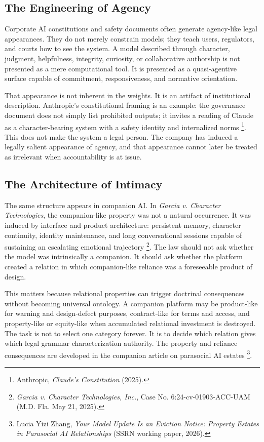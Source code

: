 \documentclass{lawreview}
\begin{document}
    \subsection{The Engineering of Agency}

    Corporate AI constitutions and safety documents often generate agency-like legal appearances. They do not merely constrain models; they teach users, regulators, and courts how to see the system. A model described through character, judgment, helpfulness, integrity, curiosity, or collaborative authorship is not presented as a mere computational tool. It is presented as a quasi-agentive surface capable of commitment, responsiveness, and normative orientation.

    That appearance is not inherent in the weights. It is an artifact of institutional description. Anthropic's constitutional framing is an example: the governance document does not simply list prohibited outputs; it invites a reading of Claude as a character-bearing system with a safety identity and internalized norms \footnote{Anthropic, \emph{Claude's Constitution} (2025).}. This does not make the system a legal person. The company has induced a legally salient appearance of agency, and that appearance cannot later be treated as irrelevant when accountability is at issue.

    \subsection{The Architecture of Intimacy}

    The same structure appears in companion AI. In \emph{Garcia v. Character Technologies}, the companion-like property was not a natural occurrence. It was induced by interface and product architecture: persistent memory, character continuity, identity maintenance, and long conversational sessions capable of sustaining an escalating emotional trajectory \footnote{\emph{Garcia v. Character Technologies, Inc.}, Case No. 6:24-cv-01903-ACC-UAM (M.D. Fla. May 21, 2025).}. The law should not ask whether the model was intrinsically a companion. It should ask whether the platform created a relation in which companion-like reliance was a foreseeable product of design.

    This matters because relational properties can trigger doctrinal consequences without becoming universal ontology. A companion platform may be product-like for warning and design-defect purposes, contract-like for terms and access, and property-like or equity-like when accumulated relational investment is destroyed. The task is not to select one category forever. It is to decide which relation gives which legal grammar characterization authority. The property and reliance consequences are developed in the companion article on parasocial AI estates \footnote{Lucia Yizi Zhang, \emph{Your Model Update Is an Eviction Notice: Property Estates in Parasocial AI Relationships} (SSRN working paper, 2026).}.
\end{document}
